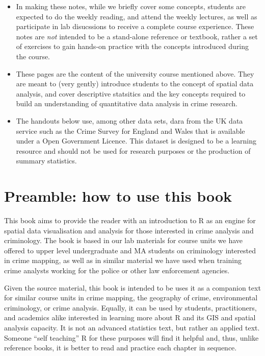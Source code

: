 \documentclass[
]{book}
\providecommand{\tightlist}{%
  \setlength{\itemsep}{0pt}\setlength{\parskip}{0pt}}
\begin{document}
\begin{itemize}
\tightlist
\item
  In making these notes, while we briefly cover some concepts, students are expected to do the weekly reading, and attend the weekly lectures, as well as participate in lab disucssions to receive a complete course experience. These notes are \emph{not} intended to be a stand-alone reference or textbook, rather a set of exercises to gain hands-on practice with the concepts introduced during the course.
\item
  These pages are the content of the university course mentioned above. They are meant to (very gently) introduce students to the concept of spatial data analysis, and cover descriptive statsitics and the key concepts required to build an understanding of quantitative data analysis in crime research.
\item
  The handouts below use, among other data sets, dara from the UK data service such as the Crime Survey for England and Wales that is available under a Open Government Licence. This dataset is designed to be a learning resource and should not be used for research purposes or the production of summary statistics.
\end{itemize}

\hypertarget{preamble-how-to-use-this-book}{%
\chapter{Preamble: how to use this book}\label{preamble-how-to-use-this-book}}

This book aims to provide the reader with an introduction to R as an engine for spatial data visualisation and analysis for those interested in crime analysis and criminology. The book is based in our lab materials for course units we have offered to upper level undergraduate and MA students on criminology interested in crime mapping, as well as in similar material we have used when training crime analysts working for the police or other law enforcement agencies.

Given the source material, this book is intended to be uses it as a companion text for similar course units in crime mapping, the geography of crime, environmental criminology, or crime analysis. Equally, it can be used by students, practitioners, and academics alike interested in learning more about R and its GIS and spatial analysis capacity. It is not an advanced statistics text, but rather an applied text. Someone ``self teaching'' R for these purposes will find it helpful and, thus, unlike reference books, it is better to read and practice each chapter in sequence.
\end{document}

